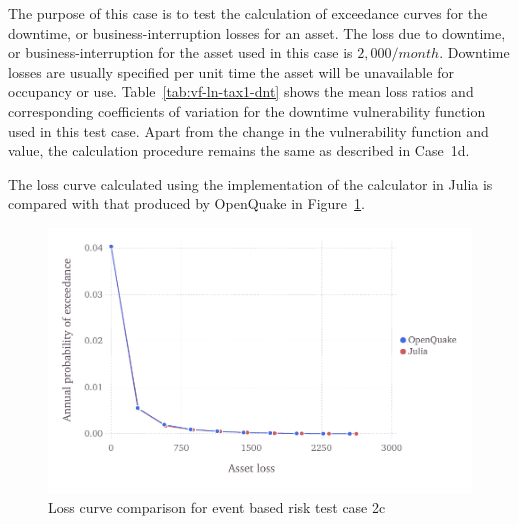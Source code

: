 The purpose of this case is to test the calculation of exceedance curves for the downtime, or business-interruption losses for an asset. The loss due to downtime, or business-interruption for the asset used in this case is $2,000 / month$. Downtime losses are usually specified per unit time the asset will be unavailable for occupancy or use. Table~\ref{tab:vf-ln-tax1-dnt} shows the mean loss ratios and corresponding coefficients of variation for the downtime vulnerability function used in this test case. Apart from the change in the vulnerability function and value, the calculation procedure remains the same as described in Case~1d.

The loss curve calculated using the implementation of the calculator in Julia is compared with that produced by OpenQuake in Figure~\ref{fig:lc-ebr-2c}.

\begin{figure}[htbp]
\centering
\includegraphics[width=12cm]{qareport/figures/fig-lc-ebr-2c}
\caption{Loss curve comparison for event based risk test case 2c}
\label{fig:lc-ebr-2c}
\end{figure}